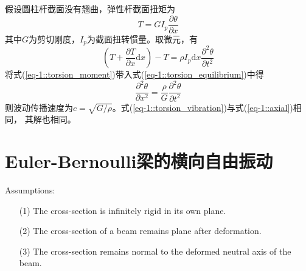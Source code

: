 假设圆柱杆截面没有翘曲，弹性杆截面扭矩为
\begin{equation}\label{eq-1::torsion_moment}
    T=GI_{p}\frac{\partial \theta}{\partial x}
\end{equation}
其中$G$为剪切刚度，$I_{p}$为截面扭转惯量。取微元，有
\begin{equation}\label{eq-1::torsion_equilibrium}
    \left(T+\frac{\partial T}{\partial x}\mathrm{d}x\right)-T=\rho I_{p}\mathrm{d}x\frac{\partial^{2}\theta}{\partial t^{2}}
\end{equation}
将式(\ref{eq-1::torsion_moment})带入式(\ref{eq-1::torsion_equilibrium})中得
\begin{equation}\label{eq-1::torsion_vibration}
    \frac{\partial^{2}\theta}{\partial x^{2}}=\frac{\rho}{G}\frac{\partial^{2}\theta}{\partial t^{2}}
\end{equation}
则波动传播速度为$c=\sqrt{G/\rho}$。式(\ref{eq-1::torsion_vibration})与式(\ref{eq-1::axial})相同，
其解也相同。

\section{Euler-Bernoulli梁的横向自由振动}
Assumptions:
\begin{enumerate}
    \item[(1)] The cross-section is infinitely rigid in its own plane.
    \item[(2)] The cross-section of a beam remains plane after deformation.
    \item[(3)] The cross-section remains normal to the deformed neutral axis of the beam.
\end{enumerate}

